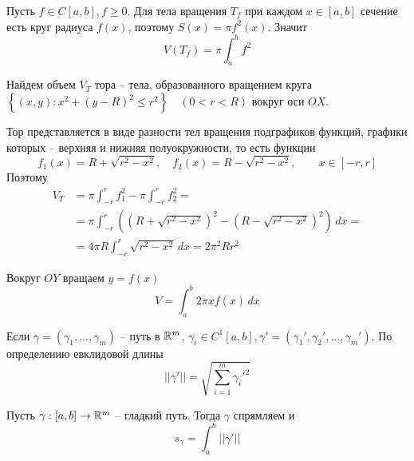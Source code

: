 \begin{figure}[h]
	\centering
	\def\svgwidth{.35\columnwidth}
	
\end{figure}

\begin{Rem}
	Пусть $f \in C[a, b], f \geqslant 0$. Для тела вращения $T_f$ при каждом $x \in [a, b]$ сечение есть круг радиуса $f(x)$,
	поэтому $S(x) = \pi f^2(x)$. Значит
	\[V(T_f) = \pi \int_a^b f^2\]  
\end{Rem}

\begin{Example}
	Найдем объем $V_T$ тора -- тела, образованного вращением круга $\left\{(x, y) : x^2 + (y - R)^2 \leqslant r^2\right\} \quad (0 < r < R)$ вокруг оси $OX$.
	
	\begin{figure}[H]
		\centering
		\def\svgwidth{.35\columnwidth}
		
	\end{figure}
	
	Тор представляется в виде разности тел вращения подграфиков функций, графики которых -- верхняя и нижняя полуокружности, то есть функции
	\[f_1(x) = R + \sqrt{r^2 - x^2}, \quad f_2(x) = R - \sqrt{r^2 - x^2}, \qquad x \in [-r, r]\]
	Поэтому
	\begin{align*}
		V_T &= \pi \int_{-r}^r f_1^2 - \pi \int_{-r}^r f_2^2 = \\
		&= \pi \int_{-r}^r \left(\left(R + \sqrt{r^2 - x^2}\right)^2 - \left(R - \sqrt{r^2 - x^2}\right)^2\right)\,dx =\\
		&= 4\pi R \int_{-r}^r \sqrt{r^2 - x^2}\,dx = 2\pi^2 Rr^2
	\end{align*}
\end{Example}

\begin{Rem}
	Вокруг $OY$ вращаем $y = f(x)$ 
	\[V = \int_a^b 2\pi x f(x) \,dx\]	
\end{Rem}


Если $\gamma = (\gamma_1, ..., \gamma_m)$ -- путь в $\mathbb{R}^m$, $\gamma_i \in C^1[a, b], \gamma' = (\gamma_1', \gamma_2', ..., \gamma_m')$.
По определению евклидовой длины
\[||\gamma'|| = \sqrt{\sum_{i = 1}^m \gamma_i'^2}\]

\begin{Thm}
	Пусть $\gamma : [a, b] \to \mathbb{R}^m$ -- гладкий путь. Тогда $\gamma$ спрямляем и
	\[s_\gamma = \int_a^b ||\gamma'||\] 
\end{Thm}

